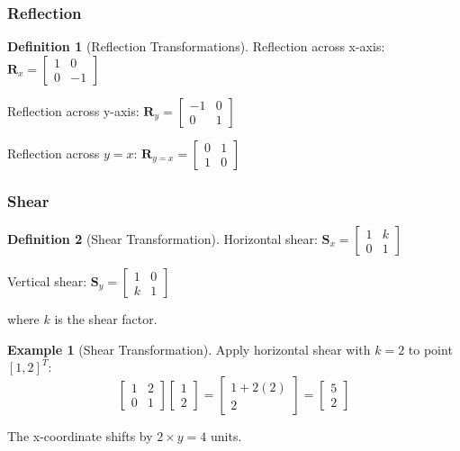 \documentclass[12pt,a4paper]{article}
\theoremstyle{definition}
\newtheorem{definition}{Definition}[section]
\newtheorem{example}{Example}[section]
\begin{document}
\subsubsection{Reflection}

\begin{definition}[Reflection Transformations]
Reflection across x-axis: $\mathbf{R}_x = \begin{bmatrix} 1 & 0 \\ 0 & -1 \end{bmatrix}$

Reflection across y-axis: $\mathbf{R}_y = \begin{bmatrix} -1 & 0 \\ 0 & 1 \end{bmatrix}$

Reflection across $y=x$: $\mathbf{R}_{y=x} = \begin{bmatrix} 0 & 1 \\ 1 & 0 \end{bmatrix}$
\end{definition}

\subsubsection{Shear}

\begin{definition}[Shear Transformation]
Horizontal shear: $\mathbf{S}_x = \begin{bmatrix} 1 & k \\ 0 & 1 \end{bmatrix}$

Vertical shear: $\mathbf{S}_y = \begin{bmatrix} 1 & 0 \\ k & 1 \end{bmatrix}$

where $k$ is the shear factor.
\end{definition}

\begin{example}[Shear Transformation]
Apply horizontal shear with $k=2$ to point $[1, 2]^T$:
\[
\begin{bmatrix}
1 & 2 \\
0 & 1
\end{bmatrix}
\begin{bmatrix}
1 \\ 2
\end{bmatrix}
= \begin{bmatrix}
1 + 2(2) \\
2
\end{bmatrix}
= \begin{bmatrix}
5 \\ 2
\end{bmatrix}
\]

The x-coordinate shifts by $2 \times y = 4$ units.
\end{example}
\end{document}
